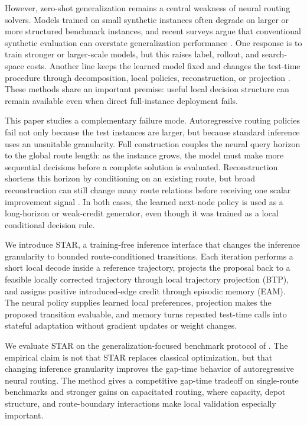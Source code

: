 \documentclass[11pt]{article}
\newcommand{\BTP}{\textsc{BTP}}
\newcommand{\method}{\textsc{STAR}}
\newcommand{\EAM}{\textsc{EAM}}
\begin{document}
However, zero-shot generalization remains a central weakness of neural routing solvers. Models trained on small synthetic instances often degrade on larger or more structured benchmark instances, and recent surveys argue that conventional synthetic evaluation can overstate generalization performance \citep{nrs_survey}. One response is to train stronger or larger-scale models, but this raises label, rollout, and search-space costs. Another line keeps the learned model fixed and changes the test-time procedure through decomposition, local policies, reconstruction, or projection \citep{learn2delegate,htsp,glop,invit,ttpl}. These methods share an important premise: useful local decision structure can remain available even when direct full-instance deployment fails.

This paper studies a complementary failure mode. Autoregressive routing policies fail not only because the test instances are larger, but because standard inference uses an unsuitable granularity. Full construction couples the neural query horizon to the global route length: as the instance grows, the model must make more sequential decisions before a complete solution is evaluated. Reconstruction shortens this horizon by conditioning on an existing route, but broad reconstruction can still change many route relations before receiving one scalar improvement signal \citep{lehd,sil}. In both cases, the learned next-node policy is used as a long-horizon or weak-credit generator, even though it was trained as a local conditional decision rule.

We introduce \method{}, a training-free inference interface that changes the inference granularity to bounded route-conditioned transitions. Each iteration performs a short local decode inside a reference trajectory, projects the proposal back to a feasible locally corrected trajectory through local trajectory projection (\BTP{}), and assigns positive introduced-edge credit through episodic memory (\EAM{}). The neural policy supplies learned local preferences, projection makes the proposed transition evaluable, and memory turns repeated test-time calls into stateful adaptation without gradient updates or weight changes.

We evaluate \method{} on the generalization-focused benchmark protocol of \citet{nrs_survey}. The empirical claim is not that \method{} replaces classical optimization, but that changing inference granularity improves the gap-time behavior of autoregressive neural routing. The method gives a competitive gap-time tradeoff on single-route benchmarks and stronger gains on capacitated routing, where capacity, depot structure, and route-boundary interactions make local validation especially important.
\end{document}
